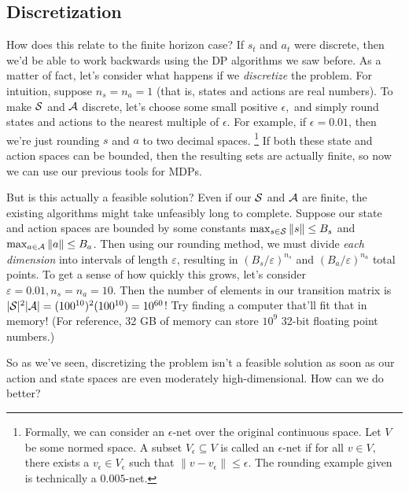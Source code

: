 \documentclass[../main/main]{subfiles}
\begin{document}

\subsection{Discretization}

How does this relate to the finite horizon case?
If $s_t$ and $a_t$ were discrete, then we'd be able to work backwards using
the DP algorithms we saw before.
As a matter of fact, let's consider what happens if we \emph{discretize} the
problem. For intuition, suppose $n_s = n_a = 1$ (that is, states and actions are real numbers).
To make $\mathcal{S}$ and $\mathcal{A}$ discrete, let's choose some small positive $\epsilon,$
and simply round states and actions to the nearest multiple of
$\epsilon.$ For example, if $\epsilon = 0.01$, then we're just rounding $s$ and $a$ to two decimal spaces. \footnote{Formally, we can consider an $\epsilon$-net over the original continuous space. Let $V$ be some normed space. A subset $V_\epsilon \subseteq V$ is called an $\epsilon$-net if for all $v \in V,$ there exists a $v_\epsilon \in V_\epsilon$ such that $\|v - v_\epsilon\| \le \epsilon.$ The rounding example given is technically a $0.005$-net.} If both these state and action spaces can be bounded, then the resulting sets are actually finite, so now we can use our previous tools for MDPs.

But is this actually a feasible solution? Even if our $\mathcal{S}$ and $\mathcal{A}$ are
finite, the existing algorithms might take unfeasibly long to complete.
Suppose our state and action spaces
are bounded by some constants $\max_{s \in \mathcal{S}} \|s\| \le B_s$ and
$\max_{a \in \mathcal{A}} \|a\| \le B_a$.
Then using our rounding method, we must divide \emph{each dimension} into intervals of length $\varepsilon$,
resulting in $(B_s/\varepsilon)^{n_s}$ and $(B_a/\varepsilon)^{n_a}$ total points.
To get a sense of how quickly this grows, let's consider $\varepsilon = 0.01, n_s = n_a = 10$. Then the number of elements in our transition matrix is $|\mathcal{S}|^2 |\mathcal{A}| = (100^{10})^2 (100^{10}) = 10^{60}$!
Try finding a computer that'll fit that in memory! (For reference, 32 GB of memory can store $10^9$ 32-bit floating point numbers.)

So as we've seen, discretizing the problem isn't a feasible solution as soon as
our action and state spaces are even moderately high-dimensional.
How can we do better?
\end{document}
